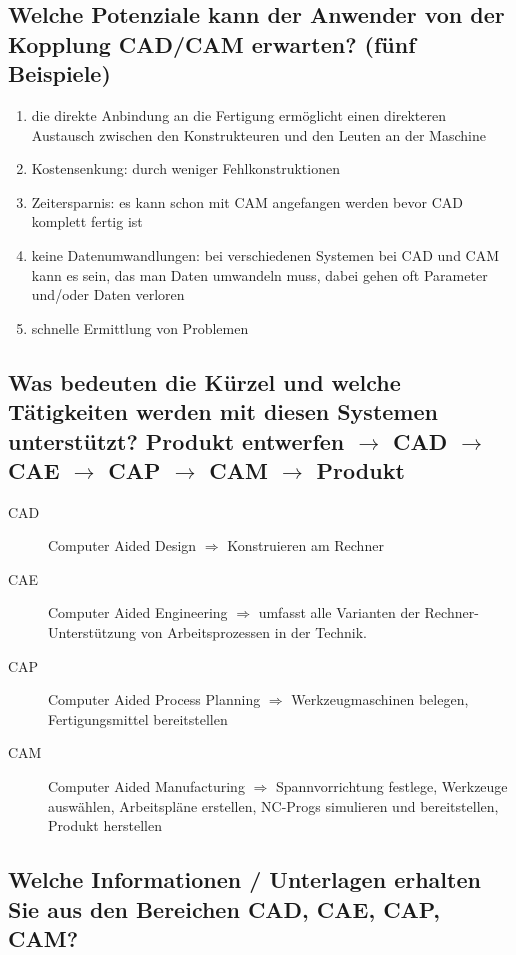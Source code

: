 \subsection*{Welche Potenziale kann der Anwender von der Kopplung CAD/CAM erwarten? 
(fünf Beispiele) }

\begin{enumerate}[1)]
\item die direkte Anbindung an die Fertigung ermöglicht einen direkteren Austausch zwischen den Konstrukteuren und den Leuten an der Maschine
\item Kostensenkung: durch weniger Fehlkonstruktionen
\item Zeitersparnis: es kann schon mit CAM angefangen werden bevor CAD komplett fertig ist
\item keine Datenumwandlungen: bei verschiedenen Systemen bei CAD und CAM kann es sein, das man Daten umwandeln muss, dabei gehen oft Parameter und/oder Daten verloren
\item schnelle Ermittlung von Problemen
\end{enumerate}

\newpage

\subsection*{Was bedeuten die Kürzel und welche Tätigkeiten werden mit diesen Systemen 
unterstützt?  
Produkt entwerfen $\rightarrow$ CAD $\rightarrow$ CAE $\rightarrow$ CAP $\rightarrow$ CAM $\rightarrow$ Produkt }

\begin{description}
\item[CAD] Computer Aided Design $\Rightarrow$ Konstruieren am Rechner
\item[CAE] Computer Aided Engineering $\Rightarrow$ umfasst alle Varianten der Rechner-Unterstützung von Arbeitsprozessen in der Technik.
\item[CAP] Computer Aided Process Planning $\Rightarrow$ Werkzeugmaschinen belegen, Fertigungsmittel bereitstellen
\item[CAM] Computer Aided Manufacturing $\Rightarrow$ Spannvorrichtung festlege, Werkzeuge auswählen, Arbeitspläne erstellen, NC-Progs simulieren und bereitstellen, Produkt herstellen
\end{description}

\subsection*{Welche Informationen / Unterlagen erhalten Sie aus den Bereichen CAD, CAE, 
CAP, CAM? }


